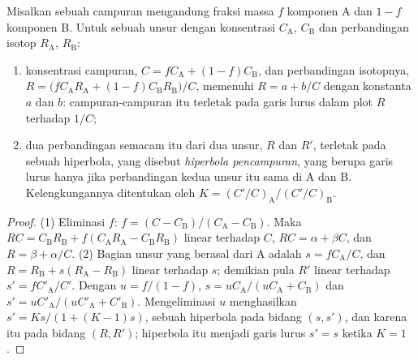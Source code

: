 \begin{proposition}\label{prop:b2:isotope-geochemistry:mixing}
Misalkan sebuah campuran mengandung fraksi massa $f$ komponen A dan $1-f$ komponen
B. Untuk sebuah unsur dengan konsentrasi $C_{\mathrm A}$, $C_{\mathrm B}$ dan perbandingan
isotop $R_{\mathrm A}$, $R_{\mathrm B}$:
\begin{enumerate}
\item konsentrasi campuran, $C = fC_{\mathrm A} + (1-f)C_{\mathrm B}$, dan
perbandingan isotopnya,
$R = \bigl(fC_{\mathrm A}R_{\mathrm A} + (1-f)C_{\mathrm B}R_{\mathrm B}\bigr)/C$, memenuhi
$R = a + b/C$ dengan konstanta $a$ dan $b$: campuran-campuran itu terletak pada garis lurus dalam
plot $R$ terhadap $1/C$;
\item dua perbandingan semacam itu dari dua unsur, $R$ dan $R'$, terletak pada sebuah hiperbola, yang disebut
\emph{hiperbola pencampuran}, yang berupa garis lurus hanya
jika perbandingan kedua unsur itu sama di A dan B. Kelengkungannya ditentukan oleh
$K = (C'/C)_{\mathrm A}/(C'/C)_{\mathrm B}$.
\end{enumerate}
\end{proposition}

\begin{proof}
(1) Eliminasi $f$: $f = (C - C_{\mathrm B})/(C_{\mathrm A} - C_{\mathrm B})$. Maka
$RC = C_{\mathrm B}R_{\mathrm B} + f(C_{\mathrm A}R_{\mathrm A} - C_{\mathrm B}R_{\mathrm
B})$ linear terhadap $C$, $RC = \alpha + \beta C$, dan $R = \beta + \alpha/C$.
(2) Bagian unsur yang berasal dari A adalah $s = fC_{\mathrm A}/C$, dan $R =
R_{\mathrm B} + s(R_{\mathrm A} - R_{\mathrm B})$ linear terhadap $s$; demikian pula $R'$
linear terhadap $s' = fC'_{\mathrm A}/C'$. Dengan $u = f/(1-f)$, $s = u C_{\mathrm
A}/(uC_{\mathrm A} + C_{\mathrm B})$ dan $s' = uC'_{\mathrm A}/(uC'_{\mathrm A} +
C'_{\mathrm B})$. Mengeliminasi $u$ menghasilkan $s' = Ks/(1 + (K-1)s)$, sebuah hiperbola pada
bidang $(s, s')$, dan karena itu pada bidang $(R, R')$; hiperbola itu menjadi garis lurus $s' = s$
ketika $K = 1$.
\end{proof}

